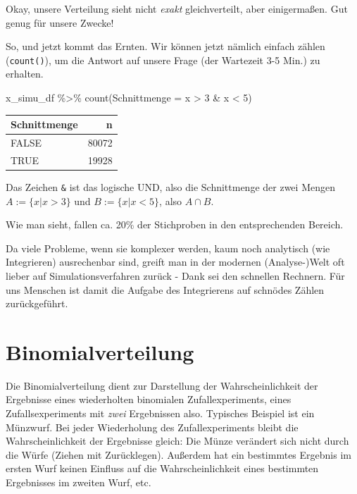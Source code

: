 \documentclass[
  a4paper,
  DIV=11]{scrreprt}
\newenvironment{Shaded}{\begin{snugshade}}{\end{snugshade}}
\newcommand{\AttributeTok}[1]{\textcolor[rgb]{0.40,0.45,0.13}{#1}}
\newcommand{\DecValTok}[1]{\textcolor[rgb]{0.68,0.00,0.00}{#1}}
\newcommand{\FunctionTok}[1]{\textcolor[rgb]{0.28,0.35,0.67}{#1}}
\newcommand{\NormalTok}[1]{\textcolor[rgb]{0.00,0.23,0.31}{#1}}
\newcommand{\SpecialCharTok}[1]{\textcolor[rgb]{0.37,0.37,0.37}{#1}}
\theoremstyle{definition}
\theoremstyle{remark}
\begin{document}
Okay, unsere Verteilung sieht nicht \emph{exakt} gleichverteilt, aber
einigermaßen. Gut genug für unsere Zwecke!

So, und jetzt kommt das Ernten. Wir können jetzt nämlich einfach zählen
(\texttt{count()}), um die Antwort auf unsere Frage (der Wartezeit 3-5
Min.) zu erhalten.

\begin{Shaded}
\begin{Highlighting}[]
\NormalTok{x\_simu\_df }\SpecialCharTok{\%\textgreater{}\%} 
  \FunctionTok{count}\NormalTok{(}\AttributeTok{Schnittmenge =}\NormalTok{ x }\SpecialCharTok{\textgreater{}} \DecValTok{3} \SpecialCharTok{\&}\NormalTok{ x }\SpecialCharTok{\textless{}} \DecValTok{5}\NormalTok{)}
\end{Highlighting}
\end{Shaded}

\begin{longtable}[]{@{}lr@{}}
\toprule()
Schnittmenge & n \\
\midrule()
\endhead
FALSE & 80072 \\
TRUE & 19928 \\
\bottomrule()
\end{longtable}

Das Zeichen \texttt{\&} ist das logische UND, also die Schnittmenge der
zwei Mengen \(A := \{x|x>3\}\) und \(B := \{x|x<5\}\), also
\(A \cap B\).

Wie man sieht, fallen ca. 20\% der Stichproben in den entsprechenden
Bereich.

Da viele Probleme, wenn sie komplexer werden, kaum noch analytisch (wie
Integrieren) ausrechenbar sind, greift man in der modernen
(Analyse-)Welt oft lieber auf Simulationsverfahren zurück - Dank sei den
schnellen Rechnern. Für uns Menschen ist damit die Aufgabe des
Integrierens auf schnödes Zählen zurückgeführt.

\hypertarget{sec-bin-distrib}{%
\section{Binomialverteilung}\label{sec-bin-distrib}}

\begin{tcolorbox}[enhanced jigsaw, leftrule=.75mm, left=2mm, bottomrule=.15mm, opacityback=0, coltitle=black, colbacktitle=quarto-callout-important-color!10!white, opacitybacktitle=0.6, rightrule=.15mm, toptitle=1mm, colback=white, colframe=quarto-callout-important-color-frame, arc=.35mm, toprule=.15mm, breakable, titlerule=0mm, bottomtitle=1mm, title=\textcolor{quarto-callout-important-color}{\faExclamation}\hspace{0.5em}{Wichtig}]
Die Binomialverteilung dient zur Darstellung der Wahrscheinlichkeit der
Ergebnisse eines wiederholten binomialen Zufallexperiments, eines
Zufallsexperiments mit \emph{zwei} Ergebnissen also. Typisches Beispiel
ist ein Münzwurf. Bei jeder Wiederholung des Zufallexperiments bleibt
die Wahrscheinlichkeit der Ergebnisse gleich: Die Münze verändert sich
nicht durch die Würfe (Ziehen mit Zurücklegen). Außerdem hat ein
bestimmtes Ergebnis im ersten Wurf keinen Einfluss auf die
Wahrscheinlichkeit eines bestimmten Ergebnisses im zweiten Wurf, etc.
\end{tcolorbox}
\end{document}
